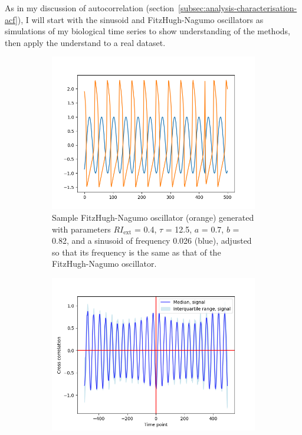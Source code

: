 As in my discussion of autocorrelation (section~\ref{subsec:analysis-characterisation-acf}), I will start with the sinusoid and FitzHugh-Nagumo oscillators as simulations of my biological time series to show understanding of the methods, then apply the understand to a real dataset.

\begin{figure}
  \centering
  \begin{subfigure}[t]{0.45\textwidth}
  \centering
    \includegraphics[width=\linewidth]{sinusoid_and_fitzhughnagumo_nonoise.png}
    \caption{
      Sample FitzHugh-Nagumo oscillator (orange) generated with parameters $RI_{\mathrm{ext}}$ = 0.4, $\tau$ = 12.5, $a$ = 0.7, $b$ = 0.82, and a sinusoid of frequency 0.026 (blue), adjusted so that its frequency is the same as that of the FitzHugh-Nagumo oscillator.
    }
    \label{fig:xcf-nonoise-ts}
  \end{subfigure}%
  \centering
  \begin{subfigure}[t]{0.45\textwidth}
  \centering
    \includegraphics[width=\linewidth]{randomshift_sinusoid_fitzhughnagumo_xcf.png}

\end{subfigure}
\end{figure}

